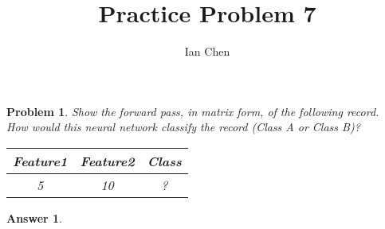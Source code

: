 \documentclass[11pt]{article}
\author{Ian Chen}
\title{Practice Problem 7}
\theoremstyle{description}
\newtheorem{problem}{Problem}
\theoremstyle{break}
\newtheorem*{answer}{Answer}
\begin{document}
    \maketitle

    \begin{problem}
        Show the forward pass, in matrix form, of the following record.\\
        How would this neural network classify the record (Class A or Class B)?\\
        \begin{tabular}{|c|c|c|}
            \hline
            Feature1 & Feature2 & Class\\
            \hline
            5 & 10 & ?\\
            \hline
        \end{tabular}
    \end{problem}
    \begin{answer}
    \end{answer}
\end{document}
